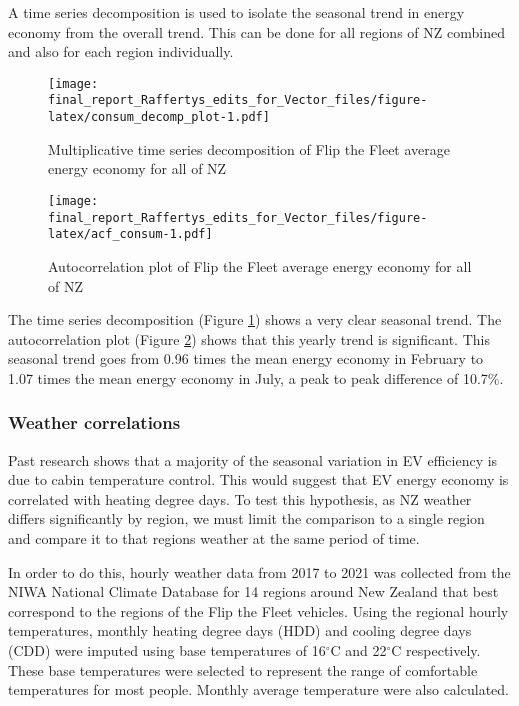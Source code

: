 \documentclass[
]{article}
\begin{document}
A time series decomposition is used to isolate the seasonal trend in
energy economy from the overall trend. This can be done for all regions
of NZ combined and also for each region individually.

\begin{figure}
\centering
\texttt{[image: final\_report\_Raffertys\_edits\_for\_Vector\_files/figure-latex/consum\_decomp\_plot-1.pdf]}
\caption{Multiplicative time series decomposition of Flip the Fleet
average energy economy for all of NZ\label{fig:consum_decomp_plot}}
\end{figure}

\begin{figure}
\centering
\texttt{[image: final\_report\_Raffertys\_edits\_for\_Vector\_files/figure-latex/acf\_consum-1.pdf]}
\caption{Autocorrelation plot of Flip the Fleet average energy economy
for all of NZ\label{fig:acf_consum}}
\end{figure}

The time series decomposition (Figure \ref{fig:consum_decomp_plot})
shows a very clear seasonal trend. The autocorrelation plot (Figure
\ref{fig:acf_consum}) shows that this yearly trend is significant. This
seasonal trend goes from 0.96 times the mean energy economy in February
to 1.07 times the mean energy economy in July, a peak to peak difference
of 10.7\%.

\hypertarget{weather-correlations}{%
\subsubsection{Weather correlations}\label{weather-correlations}}

Past research shows that a majority of the seasonal variation in EV
efficiency is due to cabin temperature control\cite{ev_range}. This
would suggest that EV energy economy is correlated with heating degree
days. To test this hypothesis, as NZ weather differs significantly by
region, we must limit the comparison to a single region and compare it
to that regions weather at the same period of time.

In order to do this, hourly weather data from 2017 to 2021 was collected
from the NIWA National Climate Database for 14 regions around New
Zealand that best correspond to the regions of the Flip the Fleet
vehicles. Using the regional hourly temperatures, monthly heating degree
days (HDD) and cooling degree days (CDD) were imputed using base
temperatures of 16\(^\circ\)C and 22\(^\circ\)C respectively. These base
temperatures were selected to represent the range of comfortable
temperatures for most people. Monthly average temperature were also
calculated.
\end{document}
